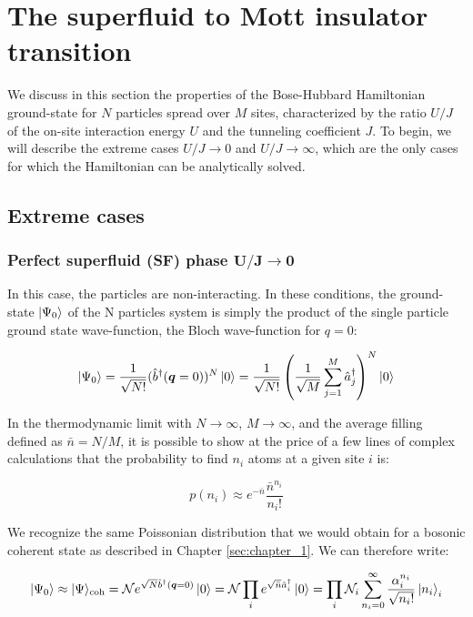 \section{The superfluid to Mott insulator transition}

We discuss in this section the properties of the Bose-Hubbard Hamiltonian ground-state for $N$ particles spread over $M$ sites, characterized by the ratio $U/J$ of the on-site interaction energy $U$ and the tunneling coefficient $J$. To begin, we will describe the extreme cases $U/J \to 0$ and $U/J \to \infty$, which are the only cases for which the Hamiltonian can be analytically solved. 

\subsection{Extreme cases}

\subsubsection{Perfect superfluid (SF) phase $\bm{U/J \to 0}$}

In this case, the particles are non-interacting. In these conditions, the ground-state $\ket{\Psi_0}$ of the N particles system is simply the product of the single particle ground state wave-function, \ie the Bloch wave-function for $q=0$:

\begin{equation}
    \ket{\Psi_0} = \frac{1}{\sqrt{N!}} (\hat{b}^{\dagger}(\bm{q}=0))^N \ket{0} = \frac{1}{\sqrt{N !}}\left(\frac{1}{\sqrt{M}} \sum_{j=1}^{M} \hat{a}_{j}^{\dagger}\right)^{N} \ket{0}
\end{equation}

\noindent In the thermodynamic limit with $N \to \infty$, $M \to \infty$, and the average filling defined as $\bar{n}=N/M$, it is possible to show at the price of a few lines of complex calculations \cite{gerbier_notes} that the probability to find $n_i$ atoms at a given site $i$ is:

\begin{equation}
    p\left(n_{i}\right) \approx e^{-\bar{n}} \frac{\bar{n}^{n_{i}}}{n_{i} !}
\end{equation}

\noindent We recognize the same Poissonian distribution that we would obtain for a bosonic coherent state as described in Chapter \ref{sec:chapter_1}. We can therefore write:

\begin{equation}
    \ket{\Psi_0} \approx |\Psi\rangle_{\mathrm{coh}}=\mathcal{N} e^{\sqrt{N} \hat{b}^{\dagger}(\bm{q}=0)} \ket{0} = \mathcal{N} \prod_{i} e^{\sqrt{\bar{n}} \hat{a}_{i}^{\dagger}} \ket{0} = \prod_{i} \mathcal{N}_{i} \sum_{n_{i}=0}^{\infty} \frac{\alpha_{i}^{n_{i}}}{\sqrt{n_{i} !}}\left|n_{i}\right\rangle_{i}
\end{equation}

